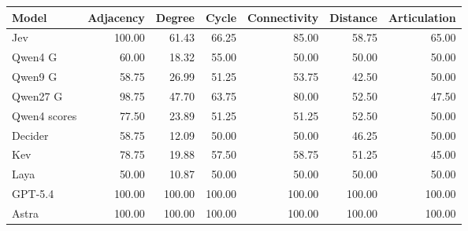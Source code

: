 \begin{tabular}{lrrrrrr}
\toprule
Model & Adjacency & Degree & Cycle & Connectivity & Distance & Articulation \\
\midrule
Jev & 100.00 & 61.43 & 66.25 & 85.00 & 58.75 & 65.00 \\
Qwen4 G & 60.00 & 18.32 & 55.00 & 50.00 & 50.00 & 50.00 \\
Qwen9 G & 58.75 & 26.99 & 51.25 & 53.75 & 42.50 & 50.00 \\
Qwen27 G & 98.75 & 47.70 & 63.75 & 80.00 & 52.50 & 47.50 \\
Qwen4 scores & 77.50 & 23.89 & 51.25 & 51.25 & 52.50 & 50.00 \\
Decider & 58.75 & 12.09 & 50.00 & 50.00 & 46.25 & 50.00 \\
Kev & 78.75 & 19.88 & 57.50 & 58.75 & 51.25 & 45.00 \\
Laya & 50.00 & 10.87 & 50.00 & 50.00 & 50.00 & 50.00 \\
\midrule
GPT-5.4 & 100.00 & 100.00 & 100.00 & 100.00 & 100.00 & 100.00 \\
Astra & 100.00 & 100.00 & 100.00 & 100.00 & 100.00 & 100.00 \\
\bottomrule
\end{tabular}
